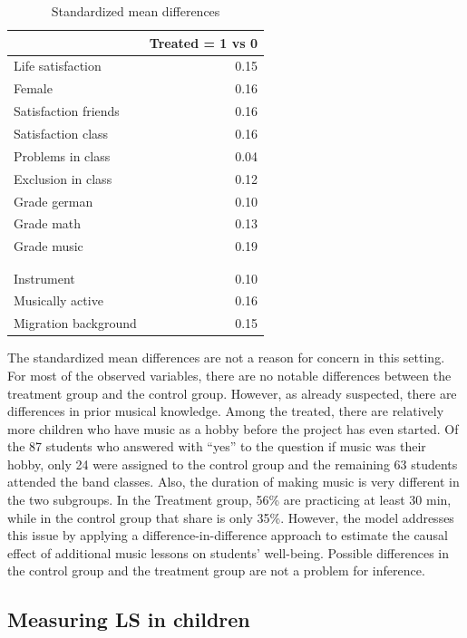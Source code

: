 \documentclass[a4, 12pt]{article}
\begin{document}
\begin{table}[H]

\caption{\label{tab:std-mean-diff}Standardized mean differences}
\centering
\begin{tabular}[t]{lr}
\toprule
  & Treated = 1 vs 0\\
\midrule
Life satisfaction & 0.15\\
Female & 0.16\\
Satisfaction friends & 0.16\\
Satisfaction class & 0.16\\
Problems in class & 0.04\\
\addlinespace
Exclusion in class & 0.12\\
Grade german & 0.10\\
Grade math & 0.13\\
Grade music & 0.19\\
\cellcolor[HTML]{cce5ff}{Hobby music} & \cellcolor[HTML]{cce5ff}{0.54}\\
\addlinespace
\cellcolor[HTML]{cce5ff}{Duration music} & \cellcolor[HTML]{cce5ff}{0.45}\\
Instrument & 0.10\\
Musically active & 0.16\\
Migration background & 0.15\\
\bottomrule
\end{tabular}
\end{table}

The standardized mean differences are not a reason for concern in this setting. For most of the observed variables, there are no notable differences between the treatment group and the control group. However, as already suspected, there are differences in prior musical knowledge. Among the treated, there are relatively more children who have music as a hobby before the project has even started. Of the 87 students who answered with ``yes'' to the question if music was their hobby, only 24 were assigned to the control group and the remaining 63 students attended the band classes. Also, the duration of making music is very different in the two subgroups. In the Treatment group, 56\% are practicing at least 30 min, while in the control group that share is only 35\%. However, the model addresses this issue by applying a difference-in-difference approach to estimate the causal effect of additional music lessons on students' well-being. Possible differences in the control group and the treatment group are not a problem for inference.

\hypertarget{measuring-ls-in-children}{%
\subsection{Measuring LS in children}\label{measuring-ls-in-children}}
\end{document}
